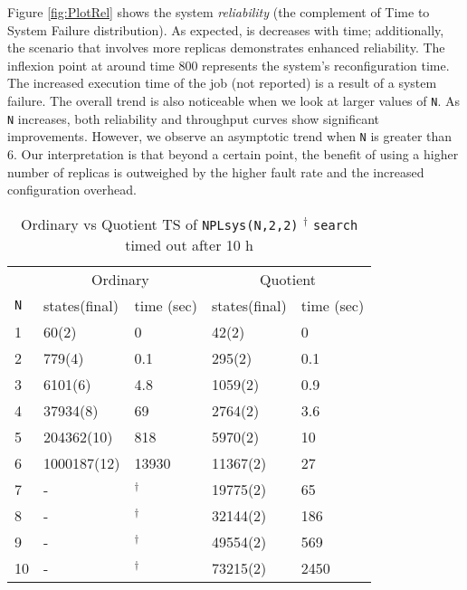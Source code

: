 Figure
\ref{fig:PlotRel} shows the system \emph{reliability} (the complement of Time to System Failure distribution).
As expected, %
is decreases with time; additionally, the scenario that involves more replicas demonstrates
enhanced reliability.
The inflexion point at around time 800
represents the system's reconfiguration time. The increased execution time of the job (not reported) is a result of a system failure.
The overall trend is also noticeable when we look at larger values of \verb|N|. As \verb|N| increases, both reliability and throughput curves show significant improvements.
However, we observe an asymptotic trend when \verb|N| is greater than 6. Our interpretation is that beyond a certain point, the benefit of using a higher number of replicas is outweighed by the higher fault rate and the increased configuration overhead.

\vspace{-0.5cm}
\begin{table}[htbp]
\centering\small
\caption{Ordinary vs Quotient TS of \texttt{NPLsys(N,2,2)} \hspace{2pt} ${}^\dag$ \texttt{search} timed out after 10 h} 
\label{tab:perf}
\begin{tabular}{ |p{0.5cm}||p{2.5cm}p{1.5cm}||p{2.5cm}p{1.5cm}| }
\hline
 & \multicolumn{2}{c||}{Ordinary} & \multicolumn{2}{|c|}{Quotient} \\
\verb|N|   & states(final)  & time (sec) &  states(final) & time (sec) \\
\hline
\hline
1   &    60(2) & 0 &      42(2) & 0\\
\hline
2   &    779(4) & 0.1 &     295(2) & 0.1\\
\hline
3  &   6101(6) & 4.8  &  1059(2) & 0.9\\
\hline
4 &    37934(8) & 69 & 2764(2) & 3.6\\
\hline
5 &   204362(10) & 818 & 5970(2) & 10 \\
\hline
6 &   1000187(12) & 13930 & 11367(2) & 27\\
\hline
7 &  - & ${}^\dag$ & 19775(2) & 65 \\
\hline
8 &  - & ${}^\dag$ &  32144(2) & 186 \\
\hline
9 & - & ${}^\dag$ &  49554(2) & 569 \\
\hline
10 & - & ${}^\dag$ & 73215(2) & 2450 \\ 
\hline
\end{tabular}
\end{table}

